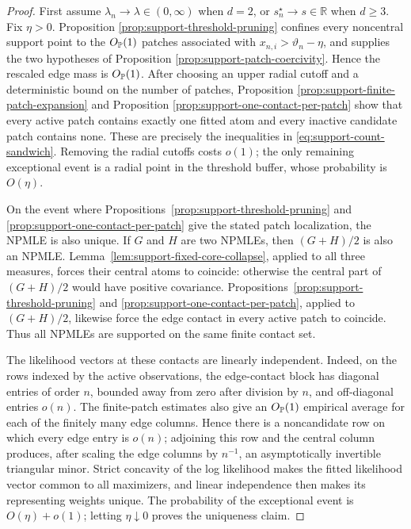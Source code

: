 \begin{proof}
First assume \(\lambda_n\to\lambda\in(0,\infty)\) when \(d=2\), or
\(s_n^\star\to s\in\mathbb R\) when \(d\ge3\). Fix \(\eta>0\). Proposition
\ref{prop:support-threshold-pruning} confines every noncentral support point
to the \(O_{\mathbb P}(1)\) patches associated with
\(x_{n,i}>\vartheta_n-\eta\), and supplies the two hypotheses of Proposition
\ref{prop:support-patch-coercivity}. Hence the rescaled edge mass is
\(O_{\mathbb P}(1)\). After choosing an upper radial cutoff and a deterministic
bound on the number of patches, Proposition
\ref{prop:support-finite-patch-expansion} and Proposition
\ref{prop:support-one-contact-per-patch} show that every active patch contains
exactly one fitted atom and every inactive candidate patch contains none.
These are precisely the inequalities in \eqref{eq:support-count-sandwich}. Removing
the radial cutoffs costs \(o(1)\); the only remaining exceptional event is a
radial point in the threshold buffer, whose probability is \(O(\eta)\).

On the event where Propositions~\ref{prop:support-threshold-pruning} and
\ref{prop:support-one-contact-per-patch} give the stated patch localization,
the NPMLE is also unique. If \(G\) and \(H\) are two NPMLEs, then
\((G+H)/2\) is also an NPMLE.  Lemma~\ref{lem:support-fixed-core-collapse},
applied to all three measures, forces their central atoms to coincide:
otherwise the central part of \((G+H)/2\) would have positive covariance.
Propositions~\ref{prop:support-threshold-pruning} and
\ref{prop:support-one-contact-per-patch}, applied to \((G+H)/2\), likewise
force the edge contact in every active patch to coincide.  Thus all NPMLEs
are supported on the same finite contact set.

The likelihood vectors at these contacts are linearly independent.  Indeed,
on the rows indexed by the active observations, the edge-contact block has
diagonal entries of order \(n\), bounded away from zero after division by
\(n\), and off-diagonal entries \(o(n)\).  The finite-patch estimates also
give an \(O_{\mathbb P}(1)\) empirical average for each of the finitely many edge
columns.  Hence there is a noncandidate row on which every edge entry is
\(o(n)\); adjoining this row and the central column produces, after scaling
the edge columns by \(n^{-1}\), an asymptotically invertible triangular
minor.  Strict concavity of the log likelihood makes the fitted likelihood
vector common to all maximizers, and linear independence then makes its
representing weights unique.  The probability of the exceptional event is
\(O(\eta)+o(1)\); letting \(\eta\downarrow0\) proves the uniqueness claim.
\end{proof}
